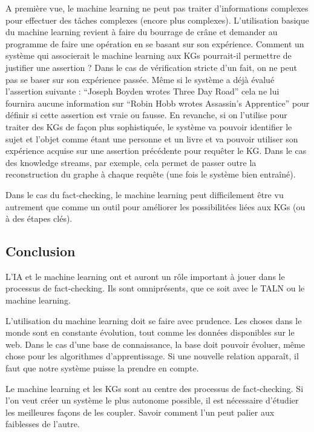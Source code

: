 A première vue, le machine learning ne peut pas traiter d'informations complexes pour effectuer des tâches complexes (encore plus complexes). L'utilisation basique du machine learning revient à faire du bourrage de crâne et demander au programme de faire une opération en se basant sur son expérience. Comment un système qui associerait le machine learning aux KGs pourrait-il permettre de justifier une assertion ? Dans le cas de vérification stricte d'un fait, on ne peut pas se baser sur son expérience passée. Même si le système a déjà évalué l'assertion suivante : \enquote{Joseph Boyden wrotes Three Day Road} cela ne lui fournira aucune information sur \enquote{Robin Hobb wrotes Assassin's Apprentice} pour définir si cette assertion est vraie ou fausse. En revanche, si on l'utilise pour traiter des KGs de façon plus sophistiquée, le système va pouvoir identifier le sujet et l'objet comme étant une personne et un livre et va pouvoir utiliser son expérience acquise sur une assertion précédente pour requêter le KG. Dans le cas des knowledge streams, par exemple, cela permet de passer outre la reconstruction du graphe à chaque requête (une fois le système bien entraîné).

Dans le cas du fact-checking, le machine learning peut difficilement être vu autrement que comme un outil pour améliorer les possibilitées liées aux KGs (ou à des étapes clés).

\subsection{Conclusion}

L'IA et le machine learning ont et auront un rôle important à jouer dans le processus de fact-checking. Ils sont omniprésents, que ce soit avec le TALN ou le machine learning. 

L'utilisation du machine learning doit se faire avec prudence. Les choses dans le monde sont en constante évolution, tout comme les données disponibles sur le web. Dans le cas d'une base de connaissance, la base doit pouvoir évoluer, même chose pour les algorithmes d'apprentissage. Si une nouvelle relation apparaît, il faut que notre système puisse la prendre en compte.

Le machine learning et les KGs sont au centre des processus de fact-checking. Si l'on veut créer un système le plus autonome possible, il est nécessaire d'étudier les meilleures façons de les coupler. Savoir comment l'un peut palier aux faiblesses de l'autre.